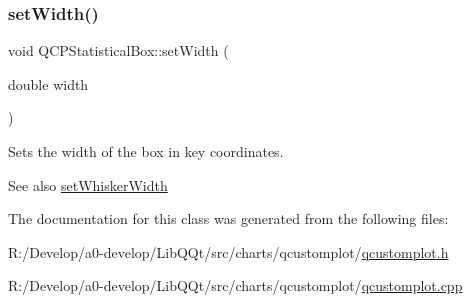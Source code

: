 \subsubsection{\texorpdfstring{set\+Width()}{setWidth()}}
{\footnotesize\ttfamily void Q\+C\+P\+Statistical\+Box\+::set\+Width (\begin{DoxyParamCaption}\item[{double}]{width }\end{DoxyParamCaption})}

Sets the width of the box in key coordinates.

\begin{DoxySeeAlso}{See also}
\mbox{\hyperlink{class_q_c_p_statistical_box_adf378812446bd66f34d1f7f293d991cd}{set\+Whisker\+Width}} 
\end{DoxySeeAlso}


The documentation for this class was generated from the following files\+:\begin{DoxyCompactItemize}
\item 
R\+:/\+Develop/a0-\/develop/\+Lib\+Q\+Qt/src/charts/qcustomplot/\mbox{\hyperlink{qcustomplot_8h}{qcustomplot.\+h}}\item 
R\+:/\+Develop/a0-\/develop/\+Lib\+Q\+Qt/src/charts/qcustomplot/\mbox{\hyperlink{qcustomplot_8cpp}{qcustomplot.\+cpp}}\end{DoxyCompactItemize}
